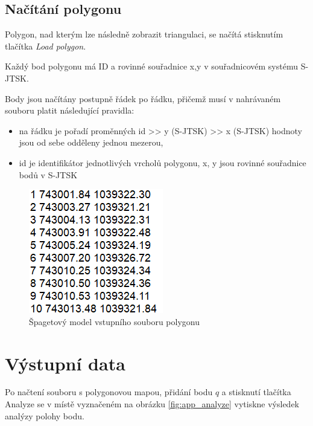 \documentclass[11pt]{article}
\begin{document}
\subsection{Načítání polygonu}
Polygon, nad kterým lze následně zobrazit triangulaci, se načítá stisknutím tlačítka \textit{Load polygon}.

Každý bod polygonu má ID a rovinné souřadnice x,y v souřadnicovém systému S-JTSK.

Body jsou načítány postupně řádek po řádku, přičemž musí v nahrávaném souboru platit následující pravidla:    

\begin{itemize}
\item na řádku je pořadí proměnných id >> y (S-JTSK) >> x (S-JTSK)  hodnoty jsou od sebe odděleny  jednou mezerou,
\item id je identifikátor jednotlivých vrcholů polygonu, x, y jsou rovinné souřadnice bodů v S-JTSK
\end{itemize}

\begin{figure}[htbh]
	\centering	\includegraphics[scale=1]{images/vstup_polygon.png} 
	\caption{Špagetový model vstupního souboru polygonu}	\label{fig:vstup_polygon}
\end{figure} 

\clearpage


\section{Výstupní data}

Po načtení souboru s polygonovou mapou, přidání bodu $q$ a stisknutí tlačítka Analyze se v místě vyznačeném na obrázku \ref{fig:app_analyze} vytiskne výsledek analýzy polohy bodu. 
\end{document}
